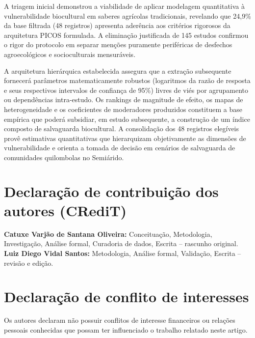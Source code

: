 A triagem inicial demonstrou a viabilidade de aplicar modelagem quantitativa à vulnerabilidade biocultural em saberes agrícolas tradicionais, revelando que 24,9\% da base filtrada (48 registros) apresenta aderência aos critérios rigorosos da arquitetura PICOS formulada. A eliminação justificada de 145 estudos confirmou o rigor do protocolo em separar menções puramente periféricas de desfechos agroecológicos e socioculturais mensuráveis. 

A arquitetura hierárquica estabelecida assegura que a extração subsequente fornecerá parâmetros matematicamente robustos (logaritmos da razão de resposta e seus respectivos intervalos de confiança de 95\%) livres de viés por agrupamento ou dependências intra-estudo. Os rankings de magnitude de efeito, os mapas de heterogeneidade e os coeficientes de moderadores produzidos constituem a base empírica que poderá subsidiar, em estudo subsequente, a construção de um índice composto de salvaguarda biocultural. A consolidação dos 48 registros elegíveis provê estimativas quantitativas que hierarquizam objetivamente as dimensões de vulnerabilidade e orienta a tomada de decisão em cenários de salvaguarda de comunidades quilombolas no Semiárido.


\section*{Declaração de contribuição dos autores (CRediT)}

\textbf{Catuxe Varjão de Santana Oliveira:} Conceituação, Metodologia, Investigação, Análise formal, Curadoria de dados, Escrita -- rascunho original. \textbf{Luiz Diego Vidal Santos:} Metodologia, Análise formal, Validação, Escrita -- revisão e edição.


\section*{Declaração de conflito de interesses}

Os autores declaram não possuir conflitos de interesse financeiros ou relações pessoais conhecidas que possam ter influenciado o trabalho relatado neste artigo.


